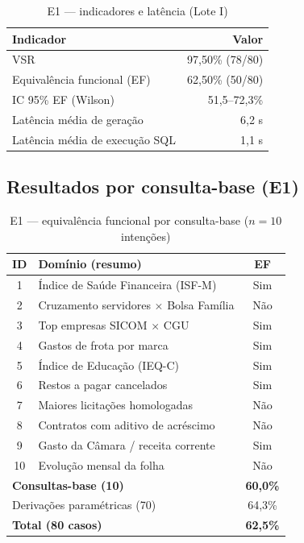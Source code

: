 \begin{table}[htbp]
\centering
\caption{E1 --- indicadores e latência (Lote I)}
\label{tab:baseline}
\begin{tabular}{lr}
\toprule
\textbf{Indicador} & \textbf{Valor} \\
\midrule
VSR & 97,50\% (78/80) \\
Equivalência funcional (EF) & 62,50\% (50/80) \\
IC 95\% EF (Wilson) & 51,5--72,3\% \\
Latência média de geração & 6,2 s \\
Latência média de execução SQL & 1,1 s \\
\bottomrule
\end{tabular}
\end{table}

\subsection{Resultados por consulta-base (E1)}

\begin{table}[H]
\centering
\caption{E1 --- equivalência funcional por consulta-base ($n=10$ intenções)}
\label{tab:base}
\small
\begin{tabular}{clc}
\toprule
\textbf{ID} & \textbf{Domínio (resumo)} & \textbf{EF} \\
\midrule
1 & Índice de Saúde Financeira (ISF-M) & Sim \\
2 & Cruzamento servidores $\times$ Bolsa Família & Não \\
3 & Top empresas SICOM $\times$ CGU & Sim \\
4 & Gastos de frota por marca & Sim \\
5 & Índice de Educação (IEQ-C) & Sim \\
6 & Restos a pagar cancelados & Sim \\
7 & Maiores licitações homologadas & Não \\
8 & Contratos com aditivo de acréscimo & Não \\
9 & Gasto da Câmara / receita corrente & Sim \\
10 & Evolução mensal da folha & Não \\
\midrule
\multicolumn{2}{l}{\textbf{Consultas-base (10)}} & \textbf{60,0\%} \\
\multicolumn{2}{l}{Derivações paramétricas (70)} & 64,3\% \\
\multicolumn{2}{l}{\textbf{Total (80 casos)}} & \textbf{62,5\%} \\
\bottomrule
\end{tabular}
\end{table}

